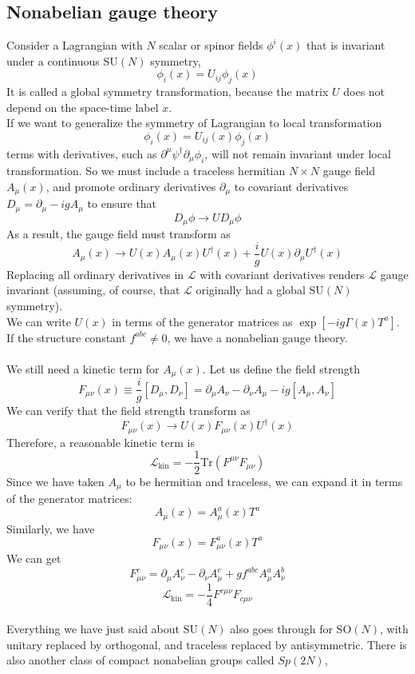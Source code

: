 \subsection{Nonabelian gauge theory}
Consider a Lagrangian with $N$ scalar or spinor fields $\phi^i(x)$ that is invariant under a continuous $\mathrm{SU}(N)$ symmetry,
\[\phi_i(x) = U_{ij}\phi_j(x)\]
It is called a global symmetry transformation, because the matrix $U$ does not depend on the space-time label $x$.
\\
If we want to generalize the symmetry of Lagrangian to local transformation
\[\phi_i(x) = U_{ij}(x)\phi_j(x)\]
terms with derivatives, such as $\partial^{\mu}\psi^{\dagger} \partial_{\mu}\phi_i$, will not remain invariant under local transformation. 
So we must include a traceless hermitian $N \times N$ gauge field $A_{\mu}(x)$, and promote ordinary derivatives $\partial_{\mu}$ to covariant derivatives $D_{\mu} = \partial_{\mu} - igA_{\mu}$ to ensure that
\[D_{\mu}\phi \to UD_{\mu}\phi\]
As a result, the gauge field must transform as
\[A_{\mu}(x) \to U(x)A_{\mu}(x)U^{\dagger}(x) + \frac{i}{g}U(x)\partial_{\mu}U^{\dagger}(x)\]
Replacing all ordinary derivatives in $\mathcal{L}$ with covariant derivatives renders $\mathcal{L}$ gauge invariant (assuming, of course, that $\mathcal{L}$ originally had a global $\mathrm{SU}(N)$ symmetry).\\
We can write $U(x)$ in terms of the generator matrices as
$\exp[-ig\Gamma(x)T^a]$. If the structure constant $f^{abc} \neq 0$, we have a nonabelian gauge theory.
\\ \\
We still need a kinetic term for $A_{\mu}(x)$. Let us define the field strength
\[F_{\mu\nu}(x) \equiv \frac{i}{g}[D_{\mu},D_{\nu}] = \partial_{\mu}A_{\nu} - \partial_{\nu}A_{\mu} - ig[A_{\mu},A_{\nu}]\]
We can verify that the field strength transform as
\[F_{\mu\nu}(x) \to U(x)F_{\mu\nu}(x)U^{\dagger}(x)\]
Therefore, a reasonable kinetic term is
\[\mathcal{L}_{\mathrm{kin}} = - \frac{1}{2} \mathrm{Tr}(F^{\mu\nu}F_{\mu\nu})\]
Since we have taken $A_{\mu}$ to be hermitian and traceless, we can expand it in terms of the generator matrices:
\[A_{\mu}(x) = A^a_{\mu}(x)T^a\]
Similarly, we have
\[F_{\mu\nu}(x) = F^a_{\mu\nu}(x)T^a \]
We can get
\[F^{c}_{\mu\nu} = \partial_{\mu}A^c_{\nu} - \partial_{\nu}A^c_{\mu} + gf^{abc}A^a_{\mu}A^b_{\nu}\]
\[\mathcal{L}_{\mathrm{kin}} = -\frac{1}{4}F^{c\mu\nu}F_{c\mu\nu}\]
\\
Everything we have just said about $\mathrm{SU}(N)$ also goes through for $\mathrm{SO}(N)$, with unitary replaced by orthogonal, and traceless replaced by antisymmetric. There is also another class of compact nonabelian groups called $Sp(2N)$,

